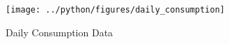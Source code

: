 \documentclass[11pt, a4paper, leqno]{article}
\begin{document}
\begin{figure}[H]

    \centering
    \texttt{[image: ../python/figures/daily\_consumption]}

    \caption{Daily Consumption Data}
    \label{fig:hourly_consumption}

\end{figure}






\printbibliography
{}



\end{document}
